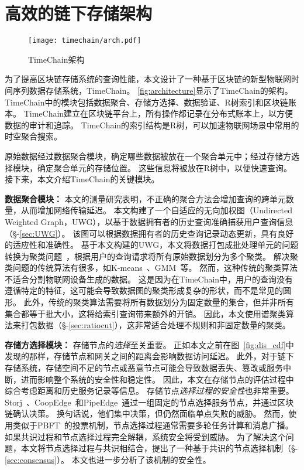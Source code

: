 \section{高效的链下存储架构}
\label{sec:design}

\begin{figure}[t]
    \centering
    \texttt{[image: timechain/arch.pdf]}
    \caption{TimeChain架构}
    \label{fig:architecture}
\end{figure}

为了提高区块链存储系统的查询性能，本文设计了一种基于区块链的新型物联网时间序列数据存储系统，TimeChain。
\autoref{fig:architecture}显示了TimeChain的架构。
TimeChain中的模块包括数据聚合、存储方选择、数据验证、R树索引和区块链账本。
TimeChain建立在区块链平台上，所有操作都记录在分布式账本上，以方便数据的审计和追踪。
TimeChain的索引结构是R树，可以加速物联网场景中常用的时空聚合搜索。

原始数据经过数据聚合模块，确定哪些数据被放在一个聚合单元中；经过存储方选择模块，确定聚合单元的存储位置。
这些信息将被放在R树中，以便快速查询。
接下来，本文介绍TimeChain的关键模块。

\textbf{数据聚合模块：}
本文的测量研究表明，不正确的聚合方法会增加查询的跨单元数量，从而增加网络传输延迟。
本文构建了一个自适应的无向加权图（Undirected Weighted Graph，UWG），以基于数据拥有者的历史查询准确捕获用户查询信息（§-\ref{sec:UWG}）。
该图可以根据数据拥有者的历史查询记录动态更新，具有良好的适应性和准确性。
基于本文构建的UWG，本文将数据打包成批处理单元的问题转换为聚类问题~\cite{xu2005survey}，根据用户的查询请求将所有原始数据划分为多个聚类。
解决聚类问题的传统算法有很多，如K-means~\cite{kanungo2002efficient}、GMM~\cite{he2010laplacian}等。
然而，这种传统的聚类算法不适合分割物联网设备生成的数据。
这是因为在TimeChain中，用户的查询没有遵循特定的特征，这可能会导致数据图的聚类形成复杂的形状，而不是常见的圆形。
此外，传统的聚类算法需要将所有数据划分为固定数量的集合，但并非所有集合都等于批大小，这将给索引查询带来额外的开销。
因此，本文使用谱聚类算法来打包数据（§-\ref{sec:ratiocut}），这非常适合处理不规则和非固定数量的聚类。

\textbf{存储方选择模块：}
存储节点的\textit{选择}至关重要。
正如本文之前在图~\autoref{fig:dis_cdf}中发现的那样，存储节点和网关之间的距离会影响数据访问延迟。
此外，对于链下存储系统，存储空间不足的节点或恶意节点可能会导致数据丢失、篡改或服务中断，进而影响整个系统的安全性和稳定性。
因此，本文在存储节点的评估过程中综合考虑距离和历史服务记录等信息。
存储节点\textit{选择过程的安全性}也非常重要。
Storj~\cite{storj2018storj}、CoopEdge~\cite{yuan2021coopedge}和PipeEdge~\cite{yuan2023pipeedge}通过一组固定的节点选择服务节点，并通过区块链确认决策。
换句话说，他们集中决策，但仍然面临单点失败的威胁。
然而，使用类似于PBFT~\cite{li2020scalable}的投票机制，节点选择过程通常需要多轮任务计算和消息广播。
如果共识过程和节点选择过程完全解耦，系统安全将受到威胁。
为了解决这个问题，本文将节点选择过程与共识相结合，提出了一种基于共识的节点选择机制（§-\ref{sec:consensus}）。
本文也进一步分析了该机制的安全性。

